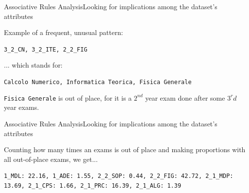 \begin{frame}{Associative Rules Analysis}{Looking for implications among the dataset's attributes}

    \alert{Example} of a frequent, unusual pattern: \\

	\vspace{0.3cm}
	\begin{centering}
		\texttt{3\_2\_CN, 3\_2\_ITE, 2\_2\_FIG}\\
	\end{centering}
	\vspace{0.3cm}

	... which stands for:

	\vspace{0.3cm}
	\begin{centering}
	\texttt{Calcolo Numerico, Informatica Teorica, Fisica Generale}\\
	\end{centering}
	\vspace{0.6cm}

	\texttt{Fisica Generale} is \alert{out of place}, for it is a $2^{nd}$ year exam done after some $3^r{d}$ year exams.\\

\end{frame}

\begin{frame}{Associative Rules Analysis}{Looking for implications among the dataset's attributes}

   Counting how many times an exams is out of place and making proportions with all out-of-place exams, we get...\\ \vspace{0.5cm}

    \centering\texttt{1\_MDL: 22.16, 1\_ADE: 1.55, 2\_2\_SOP: 0.44, 2\_2\_FIG: 42.72, 2\_1\_MDP: 13.69, 2\_1\_CPS: 1.66, 2\_1\_PRC: 16.39, 2\_1\_ALG: 1.39}

\end{frame}

